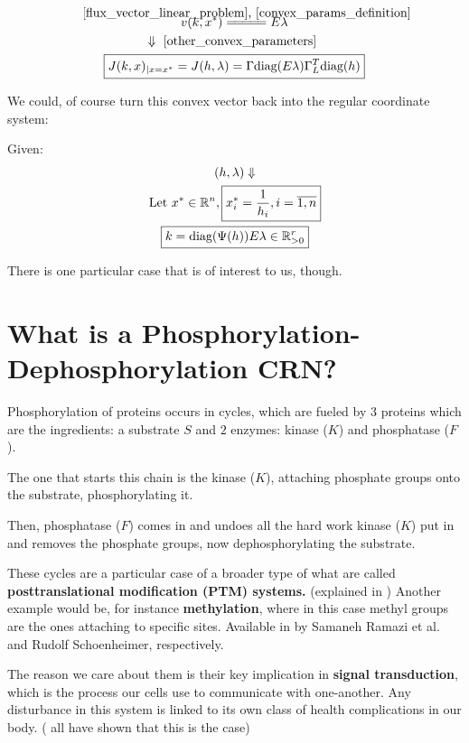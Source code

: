 \begin{gather}\label{jacobian_convex_params}
	v(k, x^*) \eqCuzConvex E \lambda  \notag \\
	\Downarrow \text{ \ref{other_convex_parameters} } \notag \\
	\boxed{J(k,x)_{|x=x^{*}}=J(h,\lambda)=\Gamma \text{diag}(E\lambda)\Gamma_{L}^{T}\text{diag}(h)}
\end{gather}

We could, of course turn this convex vector back into the regular coordinate system:

Given:
\begin{gather}\label{k_convert_back_from_convex}
	(h,\lambda) \Downarrow \notag \\
	\text{Let  } x^* \in \mathbb{R}^n , \boxed{
		x^*_i = \frac{1}{h_i} , i = \overline{1,n}
	} \notag \\
	\boxed{
		k = \text{diag}(\Psi(h)) E \lambda \in \mathbb{R}^r_{> 0}
 }
\end{gather}

There is one particular case that is of interest to us, though.

\section{What is a Phosphorylation-Dephosphorylation CRN?}\label{ch:phospho-dephospho-crn}

Phosphorylation of proteins occurs in cycles, which are fueled by $3$ proteins which are the ingredients: a substrate $S$ and $2$ enzymes: kinase ($K$) and phosphatase ($F$).

The one that starts this chain is the kinase ($K$), attaching phosphate groups onto the substrate, phosphorylating it.

Then, phosphatase ($F$) comes in and undoes all the hard work kinase ($K$) put in and removes the phosphate groups, now dephosphorylating the substrate.

\hfill\break
These cycles are a particular case of a broader type of what are called \textbf{posttranslational modification (PTM) systems.} (explained in \cite{conradi2024}) Another example would be, for instance \textbf{methylation}, where in this case methyl groups are the ones attaching to specific sites. Available in \cite{ramazi2021Ptms, SCHOENHEIMER1939333} by Samaneh Ramazi et al. and Rudolf Schoenheimer, respectively.

The reason we care about them is their key implication in \textbf{ signal transduction}, which is the process our cells use to communicate with one-another. Any disturbance in this system is linked to its own class of health complications in our body. (\cite{CONRADI2018507, 10.1093/hmg/ddp186, cohen2001Phosphorylation} all have shown that this is the case)

